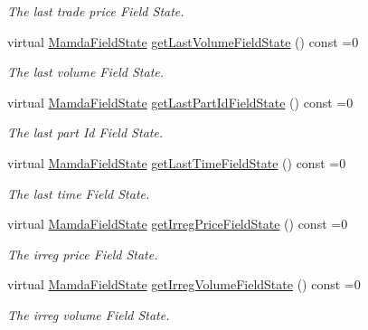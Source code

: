 \begin{CompactItemize}
\begin{CompactList}\small\item\em The last trade price Field State. \item\end{CompactList}\item 
virtual \hyperlink{namespaceWombat_93aac974f2ab713554fd12a1fa3b7d2a}{Mamda\-Field\-State} \hyperlink{classWombat_1_1MamdaTradeRecap_71887b4616edf5af0fccc2bae90a607c}{get\-Last\-Volume\-Field\-State} () const =0
\begin{CompactList}\small\item\em The last volume Field State. \item\end{CompactList}\item 
virtual \hyperlink{namespaceWombat_93aac974f2ab713554fd12a1fa3b7d2a}{Mamda\-Field\-State} \hyperlink{classWombat_1_1MamdaTradeRecap_a2b712b3f95d4613d5a1c98c61b00902}{get\-Last\-Part\-Id\-Field\-State} () const =0
\begin{CompactList}\small\item\em The last part Id Field State. \item\end{CompactList}\item 
virtual \hyperlink{namespaceWombat_93aac974f2ab713554fd12a1fa3b7d2a}{Mamda\-Field\-State} \hyperlink{classWombat_1_1MamdaTradeRecap_cb3823e27dc163ff09b61e8a41ff960f}{get\-Last\-Time\-Field\-State} () const =0
\begin{CompactList}\small\item\em The last time Field State. \item\end{CompactList}\item 
virtual \hyperlink{namespaceWombat_93aac974f2ab713554fd12a1fa3b7d2a}{Mamda\-Field\-State} \hyperlink{classWombat_1_1MamdaTradeRecap_1d1057e7954bcab91c82c327944b622d}{get\-Irreg\-Price\-Field\-State} () const =0
\begin{CompactList}\small\item\em The irreg price Field State. \item\end{CompactList}\item 
virtual \hyperlink{namespaceWombat_93aac974f2ab713554fd12a1fa3b7d2a}{Mamda\-Field\-State} \hyperlink{classWombat_1_1MamdaTradeRecap_b6b5d24579ced7928a72bb76518e10fa}{get\-Irreg\-Volume\-Field\-State} () const =0
\begin{CompactList}\small\item\em The irreg volume Field State. \item\end{CompactList}\item 

\end{CompactItemize}
